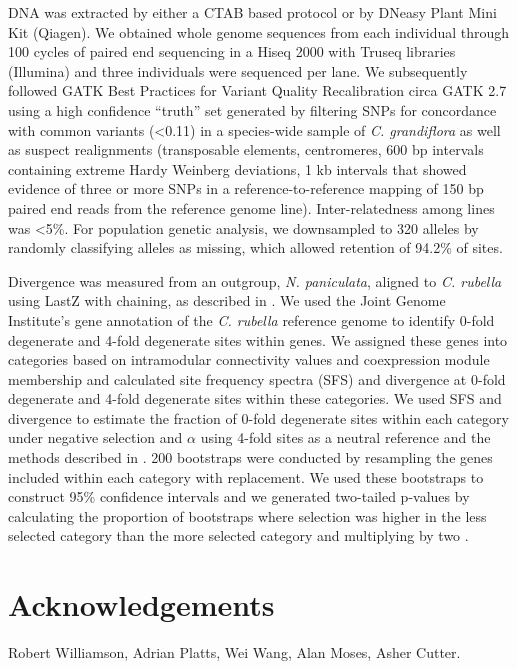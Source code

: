 DNA was extracted by either a CTAB based protocol or by DNeasy Plant Mini Kit (Qiagen). We obtained whole genome sequences from each individual through 100 cycles of paired end sequencing in a Hiseq 2000 with Truseq libraries (Illumina) and three individuals were sequenced per lane. We subsequently followed GATK Best Practices for Variant Quality Recalibration circa GATK 2.7 \citep{DePristo2011-jc} using a high confidence “truth” set generated by filtering SNPs for concordance with common variants (\textless0.11) in a species-wide sample of \textit{C. grandiflora} as well as suspect realignments (transposable elements, centromeres, 600 bp intervals containing extreme Hardy Weinberg deviations, 1 kb intervals that showed evidence of three or more SNPs in a reference-to-reference mapping of 150 bp paired end reads from the reference genome line). Inter-relatedness among lines was \textless 5\%. For population genetic analysis, we downsampled to 320 alleles by randomly classifying alleles as missing, which allowed retention of 94.2\% of sites.

Divergence was measured from an outgroup, \textit{N. paniculata}, aligned to \textit{C. rubella} using LastZ with chaining, as described in \citep{Haudry2013-qe}. We used the Joint Genome Institute’s gene annotation of the \textit{C. rubella} reference genome to identify 0-fold degenerate and 4-fold degenerate sites within genes. We assigned these genes into categories based on intramodular connectivity values and coexpression module membership and calculated site frequency spectra (SFS) and divergence at 0-fold degenerate and 4-fold degenerate sites within these categories.  We used SFS and divergence to estimate the fraction of 0-fold degenerate sites within each category under negative selection and $\alpha$ using 4-fold sites as a neutral reference and the methods described in \citet{Eyre-Walker2009-zt,keightley2007}. 200 bootstraps were conducted by resampling the genes included within each category with replacement. We used these bootstraps to construct 95\% confidence intervals and we generated two-tailed p-values by calculating the proportion of bootstraps where selection was higher in the less selected category than the more selected category and multiplying by two \citep{Eyre-Walker2009-zt}. 



\section{Acknowledgements}
Robert Williamson, Adrian Platts, Wei Wang, Alan Moses, Asher Cutter.

